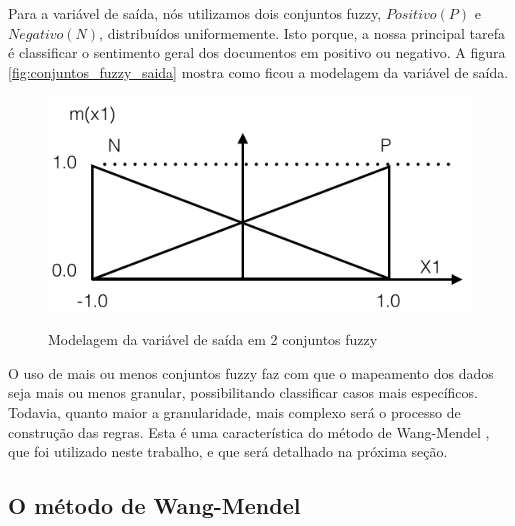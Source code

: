 
Para a variável de saída, nós utilizamos dois conjuntos fuzzy, $Positivo (P)$ e $Negativo (N)$, distribuídos uniformemente. Isto porque, a nossa principal tarefa é classificar o sentimento geral dos documentos em positivo ou negativo. A figura \ref{fig:conjuntos_fuzzy_saida} mostra como ficou a modelagem da variável de saída.

\begin{figure}[h]
\caption{Modelagem da variável de saída em 2 conjuntos fuzzy}
\centering
\includegraphics[scale=0.45]{conjuntos_fuzzy_saida.png}
\label{figura:conjuntos_fuzzy_saida}
\end{figure}

O uso de mais ou menos conjuntos fuzzy faz com que o mapeamento dos dados seja mais ou menos granular, possibilitando classificar casos mais específicos. Todavia, quanto maior a granularidade, mais complexo será o processo de construção das regras. Esta é uma característica do método de Wang-Mendel \cite{wang1992generating}, que foi utilizado neste trabalho, e que será detalhado na próxima seção.


\subsection{O método de Wang-Mendel}

